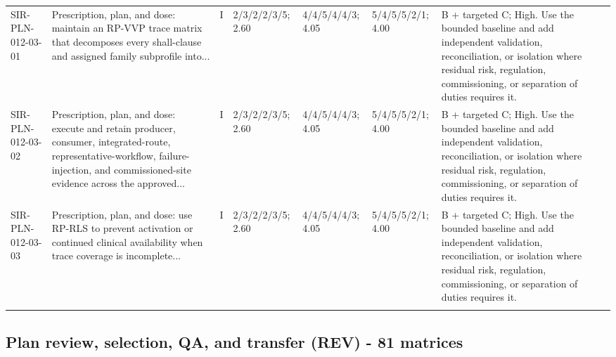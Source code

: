 \documentclass[11pt,letterpaper]{article}
\begin{document}
\begin{scriptsize}
\begin{longtable}{@{}L{0.11\textwidth}L{0.165\textwidth}L{0.04\textwidth}L{0.115\textwidth}L{0.115\textwidth}L{0.115\textwidth}L{0.235\textwidth}@{}}
\addlinespace[2pt]
SIR-PLN-012-03-01 & Prescription, plan, and dose: maintain an RP-VVP trace matrix that decomposes every shall-clause and assigned family subprofile into... & I & 2/3/2/2/3/5; 2.60 & 4/4/5/4/4/3; 4.05 & 5/4/5/5/2/1; 4.00 & B + targeted C; High. Use the bounded baseline and add independent validation, reconciliation, or isolation where residual risk, regulation, commissioning, or separation of duties requires it. \\
\addlinespace[2pt]
SIR-PLN-012-03-02 & Prescription, plan, and dose: execute and retain producer, consumer, integrated-route, representative-workflow, failure-injection, and commissioned-site evidence across the approved... & I & 2/3/2/2/3/5; 2.60 & 4/4/5/4/4/3; 4.05 & 5/4/5/5/2/1; 4.00 & B + targeted C; High. Use the bounded baseline and add independent validation, reconciliation, or isolation where residual risk, regulation, commissioning, or separation of duties requires it. \\
\addlinespace[2pt]
SIR-PLN-012-03-03 & Prescription, plan, and dose: use RP-RLS to prevent activation or continued clinical availability when trace coverage is incomplete... & I & 2/3/2/2/3/5; 2.60 & 4/4/5/4/4/3; 4.05 & 5/4/5/5/2/1; 4.00 & B + targeted C; High. Use the bounded baseline and add independent validation, reconciliation, or isolation where residual risk, regulation, commissioning, or separation of duties requires it. \\
\addlinespace[2pt]
\end{longtable}
\end{scriptsize}

\subsection{Plan review, selection, QA, and transfer (REV) - 81 matrices}
\end{document}
